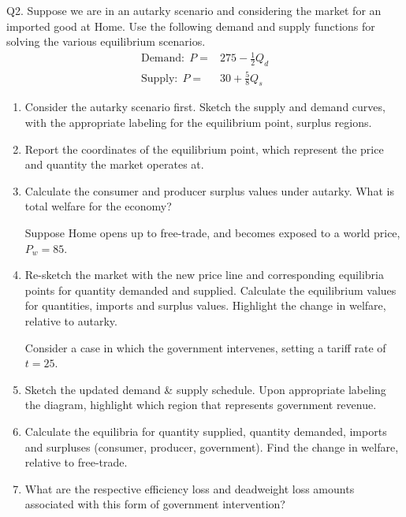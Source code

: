 \documentclass[12pt]{article}
\begin{document}
\newpage

\noindent Q2. Suppose we are in an autarky scenario and considering the market for an imported good at Home. 
Use the following demand and supply functions for solving the various equilibrium scenarios.
\begin{align*}
\text{Demand:} \ \  P = & 275 - \frac{1}{2} Q_d\\
\text{Supply:}\ \  P = & 30  + \frac{5}{8} Q_s
\end{align*}

\begin{enumerate}[1)]
	\item Consider the autarky scenario first. Sketch the supply and demand curves, with the appropriate labeling for the equilibrium point, surplus regions.
	
	\vspace{2.4in}
	
	\item Report the coordinates of the equilibrium point, which represent the price and quantity the market operates at.
	
	\vspace{1in}
	
	\item Calculate the consumer and producer surplus values under autarky.  What is total welfare for the economy?
	
	\vspace{1.4in}
	
	\noindent Suppose Home opens up to free-trade, and becomes exposed to a world price, $P_w = 85$. 
	
	\item Re-sketch the market with the new price line and corresponding equilibria points for quantity demanded and supplied. 
	Calculate the equilibrium values for quantities, imports and surplus values. 
	Highlight the change in welfare, relative to autarky. 
	
	\vspace{3in}

	
	\noindent Consider a case in which the government intervenes, setting a tariff rate of $t=25$. 
	
	\item Sketch the updated demand \& supply schedule. Upon appropriate labeling the diagram, highlight which region that represents government revenue.
	
	\vspace{3.5in}
	
	\item Calculate the equilibria for quantity supplied, quantity demanded, imports and surpluses (consumer, producer, government). 
	Find the change in welfare, relative to free-trade. 
	
	\vspace{2in}
	
	\item What are the respective efficiency loss and deadweight loss amounts associated with this form of government intervention?
	
\end{enumerate}
\end{document}
